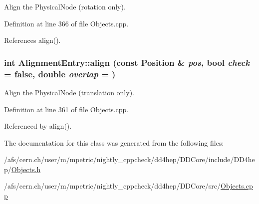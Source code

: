 Align the PhysicalNode (rotation only). 

Definition at line 366 of file Objects.cpp.

References align().\hypertarget{class_d_d4hep_1_1_geometry_1_1_alignment_entry_aea159236f1998b0b4ed084d9b33d9179}{
\subsubsection[{align}]{\setlength{\rightskip}{0pt plus 5cm}int AlignmentEntry::align (const {\bf Position} \& {\em pos}, \/  bool {\em check} = {\ttfamily false}, \/  double {\em overlap} = {})}}
\label{class_d_d4hep_1_1_geometry_1_1_alignment_entry_aea159236f1998b0b4ed084d9b33d9179}


Align the PhysicalNode (translation only). 

Definition at line 361 of file Objects.cpp.

Referenced by align().

The documentation for this class was generated from the following files:\begin{DoxyCompactItemize}
\item 
/afs/cern.ch/user/m/mpetric/nightly\_\-cppcheck/dd4hep/DDCore/include/DD4hep/\hyperlink{_objects_8h}{Objects.h}\item 
/afs/cern.ch/user/m/mpetric/nightly\_\-cppcheck/dd4hep/DDCore/src/\hyperlink{_objects_8cpp}{Objects.cpp}\end{DoxyCompactItemize}
